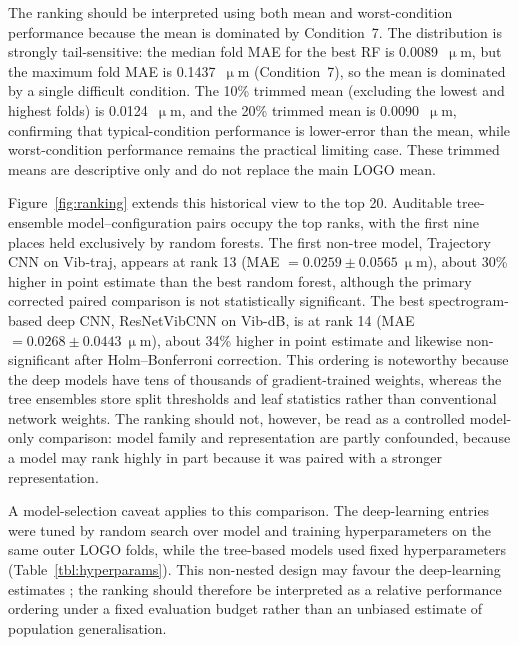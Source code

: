 The ranking should be interpreted using both mean and worst-condition
performance because the mean is dominated by Condition~7. The distribution
is strongly tail-sensitive: the median fold MAE for the best RF is
0.0089~\(\upmu\)m, but the maximum fold MAE is 0.1437~\(\upmu\)m
(Condition~7), so the mean is dominated by a single difficult condition. The 10\% trimmed mean (excluding the lowest and
highest folds) is 0.0124~\(\upmu\)m, and the 20\% trimmed mean is
0.0090~\(\upmu\)m, confirming that typical-condition performance is
lower-error than the mean, while worst-condition performance remains the
practical limiting case. These trimmed means are descriptive only and do not
replace the main LOGO mean.

Figure~\ref{fig:ranking} extends this historical view to the top 20. Auditable
tree-ensemble model--configuration pairs occupy the top ranks, with the
first nine places held exclusively by random forests. The first non-tree
model, Trajectory CNN on Vib-traj, appears at rank 13 (MAE
\(= 0.0259 \pm 0.0565~\upmu\)m), about 30\% higher in point estimate
than the best random forest, although the primary corrected paired
comparison is not statistically significant. The best spectrogram-based
deep CNN, ResNetVibCNN on Vib-dB, is at rank 14 (MAE
\(= 0.0268 \pm 0.0443~\upmu\)m), about 34\% higher in point estimate
and likewise non-significant after Holm--Bonferroni correction.
This ordering is noteworthy because the deep models have tens of
thousands of gradient-trained weights, whereas the tree ensembles store
split thresholds and leaf statistics rather than conventional network
weights. The ranking should not, however, be read as a controlled
model-only comparison: model family and representation are partly
confounded, because a model may rank highly in part because it was paired
with a stronger representation.

A model-selection caveat applies to this comparison. The deep-learning
entries were tuned by random search over model and training hyperparameters
on the same outer LOGO folds, while the tree-based models used fixed
hyperparameters (Table~\ref{tbl:hyperparams}). This non-nested design may
favour the deep-learning estimates \cite{varma2006bias}; the ranking should
therefore be interpreted as a relative performance ordering under a fixed
evaluation budget rather than an unbiased estimate of population
generalisation.


